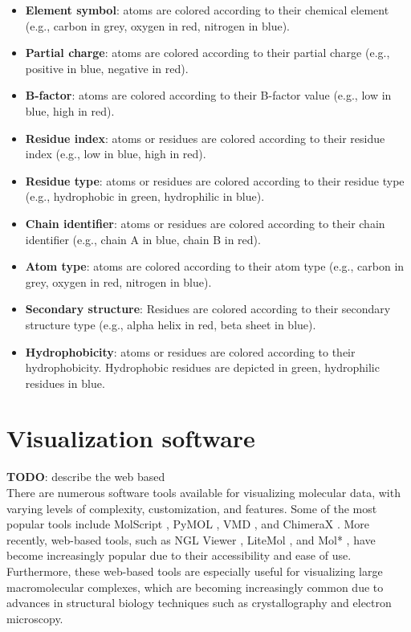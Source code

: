 \documentclass[
  digital,     %
  oneside,     %
  nosansbold,  %
  nocolorbold, %
  lof,         %
  lot,         %
]{fithesis4}
\begin{document}
\begin{itemize}
  \item \textbf{Element symbol}: atoms are colored according to their chemical element (e.g., carbon in grey, oxygen in red, nitrogen in blue).
  \item \textbf{Partial charge}: atoms are colored according to their partial charge (e.g., positive in blue, negative in red).
  \item \textbf{B-factor}: atoms are colored according to their B-factor value (e.g., low in blue, high in red).
  \item \textbf{Residue index}: atoms or residues are colored according to their residue index (e.g., low in blue, high in red).
  \item \textbf{Residue type}: atoms or residues are colored according to their residue type (e.g., hydrophobic in green, hydrophilic in blue).
  \item \textbf{Chain identifier}: atoms or residues are colored according to their chain identifier (e.g., chain A in blue, chain B in red).
  \item \textbf{Atom type}: atoms are colored according to their atom type (e.g., carbon in grey, oxygen in red, nitrogen in blue).
  \item \textbf{Secondary structure}: Residues are colored according to their secondary structure type (e.g., alpha helix in red, beta sheet in blue).
  \item \textbf{Hydrophobicity}: atoms or residues are colored according to their hydrophobicity. Hydrophobic residues are depicted in green, hydrophilic residues in blue.
\end{itemize}


\section{Visualization software}
\label{section:visualization_software}

\textbf{TODO}: describe the web based \\

There are numerous software tools available for visualizing molecular data, with varying levels of complexity, customization, and features. Some of the most popular tools include MolScript \cite{kraulis1991molscript}, PyMOL \cite{delano2002pymol}, VMD \cite{humphrey1996vmd}, and ChimeraX \cite{goddard2018ucsf}. More recently, web-based tools, such as NGL Viewer \cite{rose2015ngl}, LiteMol \cite{sehnal2017litemol}, and Mol* \cite{sehnal2021molstar}, have become increasingly popular due to their accessibility and ease of use. Furthermore, these web-based tools are especially useful for visualizing large macromolecular complexes, which are becoming increasingly common due to advances in structural biology techniques such as crystallography and electron microscopy. \cite{sehnal2021molstar}
\end{document}
